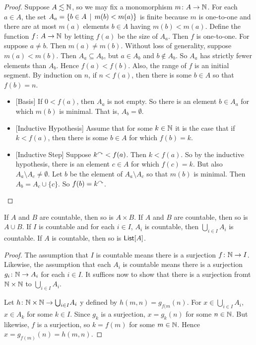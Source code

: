 \begin{theorem}
\begin{proof}
		Suppose $A\lesssim \mathbb N$, so we may fix a monomorphism ${m}\colon{A}\to{\mathbb N}$. 
		For each $a\in A$, the set $A_a = \{b\in A\,\mid\, m(b)<m(a)\}$ is finite because $m$ is one-to-one and there are at most $m(a)$ elements $b\in A$ having $m(b)<m(a)$.
		Define the function ${f}\colon{A}\to{\mathbb N}$ by letting $f(a)$ be the size of $A_a$. 
		Then $f$ is one-to-one. 
		For suppose $a\neq b$. 
		Then $m(a)\neq m(b)$. 
		Without loss of generality, suppose $m(a)<m(b)$.
		Then $A_a\subseteq A_b$, but $a\in A_b$ and $b\notin A_b$.
		So $A_a$ has strictly fewer elements than $A_b$.
		Hence $f(a)<f(b)$. Also, the range of $f$ is an initial segment.
		By induction on $n$, if $n<f(a)$, then there is some $b\in A$ so that $f(b)=n$.
		\begin{itemize}
			\item{}[Basis] If $0<f(a)$, then $A_a$ is not empty. 
			So there is an element $b \in A_a$ for which $m(b)$ is minimal. 
			That is, $A_b=\emptyset$.
			\item{}[Inductive Hypothesis] Assume that for some $k\in\mathbb N$ it is the case that if $k<f(a)$, then there is some $b\in A$ for which $f(b)=k$.
			\item{}[Inductive Step] Suppose $k^\curvearrowright < f(a)$. 
			Then $k<f(a)$. 
			So by the inductive hypothesis, there is an element $c\in A$ for which $f(c)=k$. But also $A_a\setminus A_c \neq \emptyset$. Let $b$ be the element of $A_a\setminus A_c$ so that $m(b)$ is minimal. Then $A_b = A_c\cup\{c\}$. So $f(b)=k^\curvearrowright$.
		\end{itemize}
	\end{proof}
\end{theorem}



\begin{lemma}
	If $A$ and $B$ are countable, then so is $A\times B$.
	If $A$ and $B$ are countable, then so is $A\cup B$.
	If $I$ is countable and for each $i\in I$, $A_i$ is countable, then $\bigcup_{i\in I}A_i$ is countable.
	If $A$ is countable, then so is $\mathord{\textsf{List}}[A]$.
	
	\begin{proof}
		The assumption that $I$ is countable means there is a surjection ${f}\colon{\mathbb N}\to{I}$. Likewise, the assumption that each $A_i$ is countable means there is a surjection ${g_i}\colon{\mathbb N}\to{A_i}$ for each $i\in I$. It suffices now to show that there is a surjection fromt $\mathbb N\times \mathbb N$ to $\bigcup_{i\in I}A_i$.
		
		Let ${h}\colon{\mathbb N\times \mathbb N}\to{\bigcup}_{i\in I}A_i$ y defined by $h(m,n) = g_{f(m}(n)$. For $x\in \bigcup_{i\in I}A_i$, $x\in  A_k$ for some $k\in I$. Since $g_k$ is a surjection, $x = g_k(n)$ for some $n\in\mathbb N$. 
		But likewise, $f$ is a surjection, so $k = f(m)$ for some $m\in\mathbb N$. 
		Hence $x = g_{f(m)}(n) = h(m,n)$.
	\end{proof}
\end{lemma}

